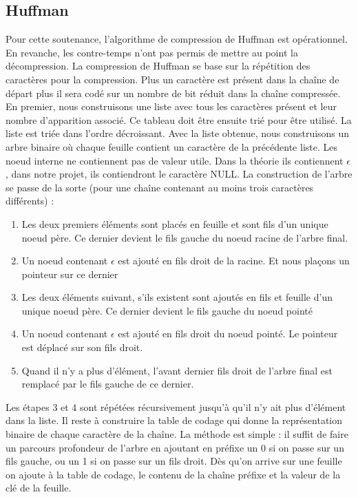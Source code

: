     \subsection{Huffman}
        Pour cette soutenance, l'algorithme de compression de Huffman est opérationnel. En revanche, les contre-temps n'ont pas permis de mettre au point la décompression.
        La compression de Huffman se base sur la répétition des caractères pour la compression. Plus un caractère est présent dans la chaîne de départ plus il sera codé sur un nombre de bit réduit dans la chaîne compressée.
        En premier, nous construisons une liste avec tous les caractères présent et leur nombre d'apparition associé. Ce tableau doit être ensuite trié pour être utilisé. La liste est triée dans l'ordre décroissant.
        Avec la liste obtenue, nous construisons un arbre binaire où chaque feuille contient un caractère de la précédente liste. Les noeud interne ne contiennent pas de valeur utile. Dans la théorie ils contiennent $\epsilon$, dans notre projet, ils contiendront le caractère NULL. La construction de l'arbre se passe de la sorte (pour une chaîne contenant au moins trois caractères différents) : 
        \begin{enumerate}
            \item Les deux premiers éléments sont placés en feuille et sont fils d'un unique noeud père. Ce dernier devient le fils gauche du noeud racine de l'arbre final.
            \item Un noeud contenant $\epsilon$ est ajouté en fils droit de la racine. Et nous plaçons un pointeur sur ce dernier
            \item Les deux éléments suivant, s'ils existent sont ajoutés en fils et feuille d'un unique noeud père. Ce dernier devient le fils gauche du noeud pointé
            \item Un noeud contenant $\epsilon$ est ajouté en fils droit du noeud pointé. Le pointeur est déplacé sur son fils droit.
            \item Quand il n'y a plus d'élément, l'avant dernier fils droit de l'arbre final est remplacé par le fils gauche de ce dernier.
        \end{enumerate}
        Les étapes 3 et 4 sont répétées récursivement jusqu'à qu'il n'y ait plus d'élément dans la liste.
        Il reste à construire la table de codage qui donne la représentation binaire de chaque caractère de la chaîne. La méthode est simple : il suffit de faire un parcours profondeur de l'arbre en ajoutant en préfixe un 0 si on passe sur un fils gauche, ou un 1 si on passe sur un fils droit. Dès qu'on arrive sur une feuille on ajoute à la table de codage, le contenu de la chaîne préfixe et la valeur de la clé de la feuille.

